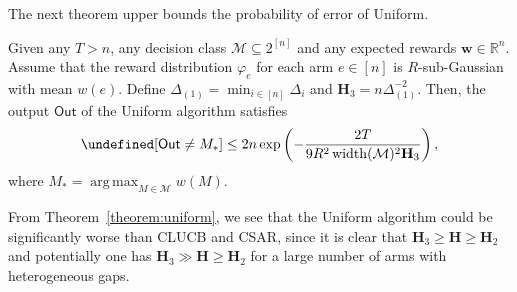 \documentclass{article}
\newcommand{\Algorithm}{{\small \textsf{CLUCB}}\xspace}
\newcommand{\AlgorithmBud}{{\small \textsf{CSAR}}\xspace}
\newcommand{\Uniform}{{\small \textsf{Uniform}}\xspace}
\newcommand{\Rew}{\varphi}
\newcommand{\M}{\mathcal M}
\newcommand{\RR}{\mathbb R}
\DeclareMathOperator{\rank}{width}
\DeclareMathOperator*{\argmax}{arg\,max}
\newcommand{\out}{\mathsf{Out}}
\let\Pr\undefined
\DeclareMathOperator{\Pr}{Pr}
\renewcommand{\vec}[1]{\boldsymbol{#1}}
\begin{document}
The next theorem upper bounds the probability of error of \Uniform.
\begin{theorem}
Given any $T>n$, any decision class $\M \subseteq 2^{[n]}$ and any expected rewards $\vec w \in \RR^{n}$.
Assume that the reward distribution $\Rew_e$ for each arm $e\in [n]$ is  $R$-sub-Gaussian with mean $w(e)$.
Define $\Delta_{(1)}=\min_{i\in[n]}\Delta_i$ and $\mathbf H_3 = n\Delta_{(1)}^{-2}$.
Then, the output $\out$ of the \Uniform algorithm satisfies
\begin{equation}
\label{eq:uniform}
\Pr[\out\not=M_*] \le 2n\exp\left(- \frac{2T}{9R^2\rank(\M)^2 \mathbf H_{3}}\right),
\end{equation}
where $M_* = \argmax_{M\in \M} w(M)$.
\label{theorem:uniform}
\end{theorem}
 
From Theorem~\ref{theorem:uniform}, we see that the \Uniform algorithm could be significantly worse than \Algorithm and \AlgorithmBud,  since it is clear that $\mathbf H_3 \ge \mathbf H \ge \mathbf H_2$ and potentially one has $\mathbf H_3 \gg \mathbf H \ge \mathbf H_2$ for a large number of arms with heterogeneous gaps.
\end{document}
